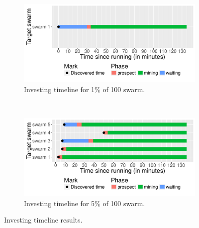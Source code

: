 \begin{figure}[th]
	\begin{adjustwidth}{-1.5cm}{}
	\begin{subfigure}[t]{0.6\textwidth}
		\centering
		\includegraphics[width=\textwidth]{pics/results/time-1p100s.pdf}
		\caption{Investing timeline for 1\% of 100 swarm.}
		\label{fig:time1p100s}
	\end{subfigure}
	~
	\begin{subfigure}[t]{0.6\textwidth}
		\centering
		\includegraphics[width=\textwidth]{pics/results/time-5p100s.pdf}
		\caption{Investing timeline for 5\% of 100 swarm.}
		\label{fig:time5p100s}
	\end{subfigure}
	\caption{Investing timeline results.}
	\label{fig:timeprosexp}
\end{adjustwidth}
\end{figure}

